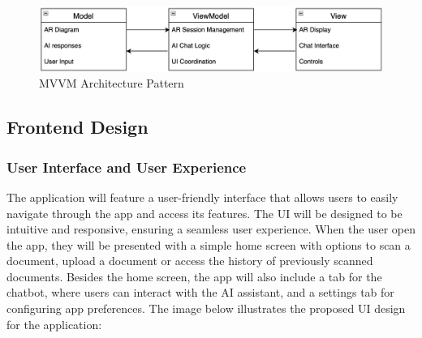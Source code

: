 \documentclass[12pt]{article}
\begin{document}
    \begin{figure}[H]
        \centering
        \includegraphics[width=\textwidth]{img/Pattern.png}
        \caption{MVVM Architecture Pattern}
        \label{fig:Pattern}
    \end{figure}

    \subsection{Frontend Design}

    \subsubsection{User Interface and User Experience}

        The application will feature a user-friendly interface that allows users to easily navigate through the app and access its features. The UI will be designed to be intuitive and responsive, ensuring a seamless user experience. When the user open the app, they will be presented with
        a simple home screen with options to scan a document, upload a document or access the history of previously scanned documents. Besides the home screen, the app will also include a tab for the chatbot, where users can interact with the AI assistant, and a settings tab for configuring
        app preferences. The image below illustrates the proposed UI design for the application:
\end{document}
